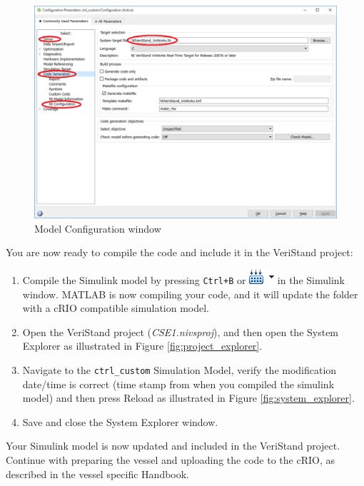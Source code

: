 \documentclass[a4paper,english]{report}
\begin{document}
	\begin{figure}[htb!]
		\centerline{\includegraphics[scale=0.5]{fig/model_conf_window.png}}
		\caption{Model Configuration window}
		\label{fig:model_configuration}
	\end{figure}
	You are now ready to compile the code and include it in the VeriStand project:
	\begin{enumerate}
		\item Compile the Simulink model by pressing \texttt{Ctrl+B} or \includegraphics{fig/build.png} in the Simulink window. MATLAB is now compiling your code, and it will update the folder  with a cRIO compatible simulation model. 
		\item Open the VeriStand project (\textit{CSE1.nivsproj}), and then open the System Explorer as illustrated in Figure \ref{fig:project_explorer}.
		\item Navigate to the \texttt{ctrl\_custom} Simulation Model, verify the modification date/time is correct (time stamp from when you compiled the simulink model) and then press Reload as illustrated in Figure \ref{fig:system_explorer}. 
		\item Save and close the System Explorer window. 
	\end{enumerate}
	Your Simulink model is now updated and included in the VeriStand project. Continue with preparing the vessel and uploading the code to the cRIO, as described in the vessel specific Handbook. 
\end{document}
